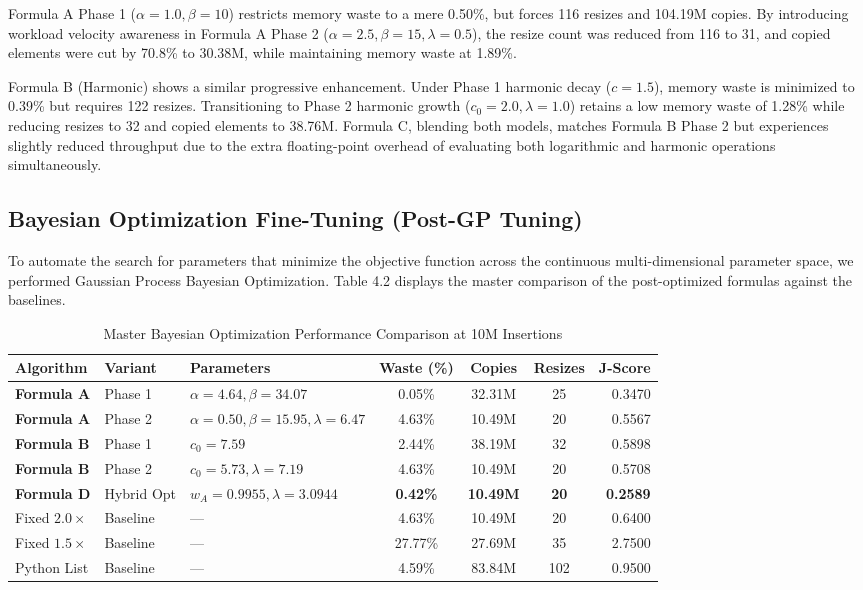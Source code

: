 Formula A Phase 1 ($\alpha=1.0, \beta=10$) restricts memory waste to a mere 
0.50\%, but forces 116 resizes and 104.19M copies. By introducing 
workload velocity awareness in Formula A Phase 2 ($\alpha=2.5, \beta=15, 
\lambda=0.5$), the resize count was reduced from 116 to 31, and copied elements 
were cut by 70.8\% to 30.38M, while maintaining memory waste at 1.89\%.

Formula B (Harmonic) shows a similar progressive enhancement. Under Phase 1 
harmonic decay ($c=1.5$), memory waste is minimized to 0.39\% but requires 122 
resizes. Transitioning to Phase 2 harmonic growth ($c_0=2.0, \lambda=1.0$) 
retains a low memory waste of 1.28\% while reducing resizes to 32 and copied 
elements to 38.76M. Formula C, blending both models, matches Formula B Phase 2 
but experiences slightly reduced throughput due to the extra floating-point 
overhead of evaluating both logarithmic and harmonic operations simultaneously.

\subsection{Bayesian Optimization Fine-Tuning (Post-GP Tuning)}
To automate the search for parameters that minimize the objective function across the continuous 
multi-dimensional parameter space, we performed Gaussian Process Bayesian 
Optimization. Table 4.2 displays the master comparison of the post-optimized 
formulas against the baselines.

\begin{table}[H]
\centering
\caption{Master Bayesian Optimization Performance Comparison at 10M Insertions}
\label{tab:bo_results}
\begin{tabularx}{\linewidth}{llLCCCr}
\toprule
\textbf{Algorithm} & \textbf{Variant} & \textbf{Parameters} & \textbf{Waste (\%)} & \textbf{Copies} & \textbf{Resizes} & \textbf{J-Score} \\
\midrule
\textbf{Formula A} & Phase 1 & $\alpha=4.64, \beta=34.07$ & 0.05\% & 32.31M & 25 & 0.3470 \\
\textbf{Formula A} & Phase 2 & $\alpha=0.50, \beta=15.95, \lambda=6.47$ & 4.63\% & 10.49M & 20 & 0.5567 \\
\textbf{Formula B} & Phase 1 & $c_0=7.59$ & 2.44\% & 38.19M & 32 & 0.5898 \\
\textbf{Formula B} & Phase 2 & $c_0=5.73, \lambda=7.19$ & 4.63\% & 10.49M & 20 & 0.5708 \\
\textbf{Formula D} & Hybrid Opt & $w_A=0.9955, \lambda=3.0944$ & \textbf{0.42\%} & \textbf{10.49M} & \textbf{20} & \textbf{0.2589} \\
\midrule
Fixed $2.0\times$ & Baseline & — & 4.63\% & 10.49M & 20 & 0.6400 \\
Fixed $1.5\times$ & Baseline & — & 27.77\% & 27.69M & 35 & 2.7500 \\
Python List & Baseline & — & 4.59\% & 83.84M & 102 & 0.9500 \\
\bottomrule
\end{tabularx}
\end{table}

